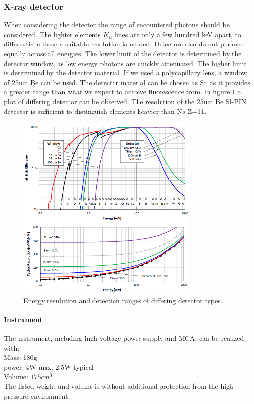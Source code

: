 \subsubsection{X-ray detector}
When considering the detector the range of encountered photons should be considered. The lighter elements $K_\alpha$ lines are only a few hundred keV apart, to differentiate these a suitable resolution is needed. Detectors also do not perform equally across all energies. The lower limit of the detector is determined by the detector window, as low energy photons are quickly attenuated. The higher limit is determined by the detector material. If we used a polycapillary lens, a window of 25um Be can be used. The detector material can be chosen as Si, as it provides a greater range than what we expect to achieve fluorescence from. In figure \ref{fig:AmptekDetector} a plot of differing detector can be observed. The resolution of the 25um Be SI-PIN detector is sufficient to distinguish elements heavier than Na Z=11.

\begin{figure}[htb]
	\centering
	\includegraphics[width=0.8\textwidth]{figures/XRF/EnergyRes.png}
	\caption{Energy resulution and detection ranges of differing detector types.\cite{AmptekDetector}}
	\label{fig:AmptekDetector}
\end{figure}

\paragraph{Instrument}
The instrument, including high voltage power supply and MCA, can be realized with\citep{AmptekDetector}:\\
Mass: 180g\\
power: 4W max, 2.5W typical\\
Volume: $175cm^{3}$\\
The listed weight and volume is without additional protection from the high pressure environment.


